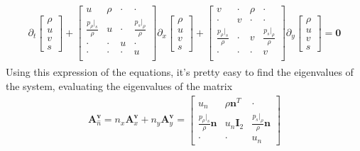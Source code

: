 \documentclass[letterpaper,10pt,english]{jupyterBook}
\begin{document}
\begin{equation}\label{equation:ch/pde/hyperbolic-nd-euler:eq:pde:hyperbolic:differential:convective:euler:rho-u-s:mat}
\begin{split}\begin{aligned}
  \partial_t \begin{bmatrix} \rho \\ u \\ v \\ s \end{bmatrix}
 + \begin{bmatrix}
   u                      & \rho            & \cdot & \cdot \\
   \frac{p_\rho|_s}{\rho} & u               & \cdot & \frac{p_s|_\rho}{\rho}  \\
   \cdot                  & \cdot           & u     & \cdot  \\
   \cdot                  & \cdot           & \cdot & u \\
   \end{bmatrix} \partial_x \begin{bmatrix} \rho \\ u \\ v \\ s \end{bmatrix}
 + \begin{bmatrix}
   v                      & \cdot           & \rho           & \cdot \\
   \cdot                  & v               & \cdot          & \cdot \\
   \frac{p_\rho|_s}{\rho} & \cdot           & v              & \frac{p_s|_\rho}{\rho}  \\
   \cdot                  & \cdot           & \cdot          & v \\
   \end{bmatrix} \partial_y \begin{bmatrix} \rho \\ u \\ v \\ s \end{bmatrix} = \mathbf{0}
\end{aligned}\end{split}
\end{equation}
\sphinxAtStartPar
Using this expression of the equations, it’s pretty easy to find the eigenvalues of the system, evaluating the eigenvalues of the matrix
\begin{equation*}
\begin{split}
\mathbf{A}^{\mathbf{v}}_{\hat{n}} = n_x \mathbf{A}^\mathbf{v}_x + n_y \mathbf{A}^\mathbf{v}_y =
\begin{bmatrix}
  u_n & \rho \mathbf{n}^T & \cdot \\
  \frac{p_\rho|_s}{\rho} \mathbf{n} & u_n \mathbf{I}_2 &  \frac{p_s|_\rho}{\rho} \mathbf{n} \\
  \cdot & \cdot & u_n
\end{bmatrix}
\end{split}
\end{equation*}
\end{document}
